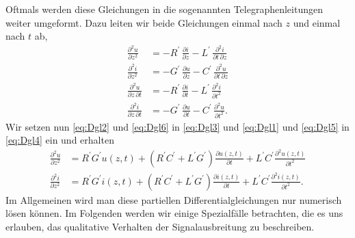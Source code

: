\documentclass[paper=a4, parskip=half-, ngerman, fontsize=11pt]{scrreprt}
\begin{document}
Oftmals werden diese Gleichungen in die sogenannten Telegraphenleitungen weiter umgeformt. Dazu leiten wir beide
Gleichungen einmal nach $z$ und einmal nach $t$ ab,
\begin{align}
    \frac{\partial^{2} u}{\partial z^2} &= -R^{\prime} \, \frac{\partial i}{\partial z} - L^{\prime} \,
    \frac{\partial^2 i}{\partial t \,
    \partial z} \label{eq:Dgl3} \\[1ex]
    \frac{\partial^{2} i}{\partial z^2} &= -G^{\prime} \, \frac{\partial u}{\partial z} - C^{\prime} \,
    \frac{\partial^2 u}{\partial t \,
    \partial z} \label{eq:Dgl4} \\[1ex]
    \frac{\partial^{2} u}{\partial z \, \partial t} &= -R^{\prime} \, \frac{\partial i}{\partial t} - L^{\prime} \,
    \frac{\partial^2
    i}{\partial t^{2}} \label{eq:Dgl5} \\[1ex]
    \frac{\partial^{2} i}{\partial z \, \partial t} &= -G^{\prime} \, \frac{\partial u}{\partial t} - C^{\prime} \,
    \frac{\partial^2
    u}{\partial t^{2}}. \label{eq:Dgl6}
\end{align}
Wir setzen nun \eqref{eq:Dgl2} und \eqref{eq:Dgl6} in \eqref{eq:Dgl3} und \eqref{eq:Dgl1} und \eqref{eq:Dgl5} in
\eqref{eq:Dgl4} ein und erhalten
\begin{align}
    \frac{\partial^{2} u}{\partial z^{2}} &= R^{\prime} G^{\prime} u(z,t) + (R^{\prime} C^{\prime} + L^{\prime}
    G^{\prime}) \frac{\partial u(z, t)}{\partial t} + L^{\prime} C^{\prime} \frac{\partial^{2} u(z,t)}{\partial t^{2}}
     \label{eq:Tele1} \\[1.5ex]
    \frac{\partial^{2} i}{\partial z^{2}} &= R^{\prime} G^{\prime} i(z,t) + (R^{\prime} C^{\prime} + L^{\prime}
    G^{\prime}) \frac{\partial i(z, t)}{\partial t} + L^{\prime} C^{\prime} \frac{\partial^{2} i(z, t)}{\partial t^{2}}.
\end{align}
Im Allgemeinen wird man diese partiellen Differentialgleichungen nur numerisch lösen können. Im Folgenden werden wir
einige Spezialfälle betrachten, die es uns erlauben, das qualitative Verhalten der Signalausbreitung zu beschreiben.
\end{document}
